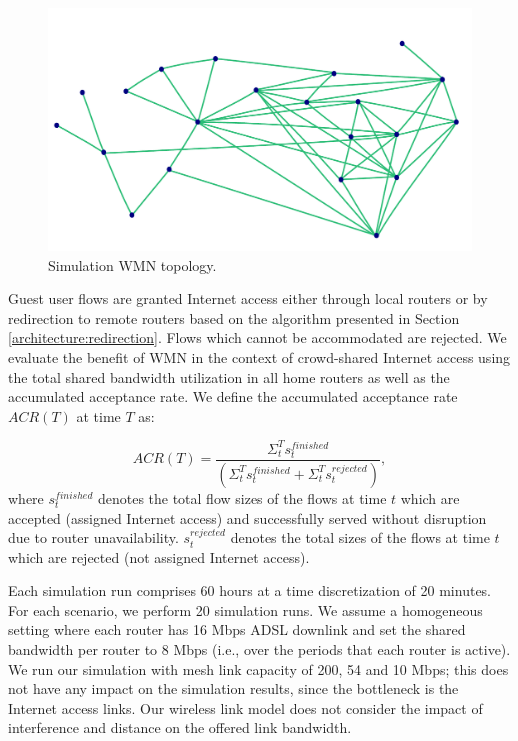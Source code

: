 \begin{figure}[t]
\begin{center}
\includegraphics[width=1\linewidth]{topology.pdf}
\caption{Simulation WMN topology.}
\label{fig:topology}
\end{center}
\end{figure}

Guest user flows are granted Internet access either through local routers or by redirection to remote routers based on the algorithm presented in Section \ref{architecture:redirection}. Flows which cannot be accommodated are rejected. We evaluate the benefit of WMN in the context of crowd-shared Internet access using the total shared bandwidth utilization in all home routers as well as the accumulated acceptance rate. We define the accumulated acceptance rate $ACR(T)$ at time $T$ as:

\begin{equation}\label{1}
ACR(T)= \frac{\Sigma^T_t s^{finished}_{t}}{(\Sigma^T_t s^{finished}_{t} + \Sigma^T_t s^{rejected}_{t})},
\end{equation}
%
where $s^{finished}_{t}$ denotes the total flow sizes of the flows at time $t$ which are accepted (assigned Internet access) and successfully served without disruption due to router unavailability. $s^{rejected}_{t}$ denotes the total sizes of the flows at time $t$ which are rejected (not assigned Internet access).

Each simulation run comprises 60 hours at a time discretization of 20 minutes. For each scenario, we perform 20 simulation runs. We assume a homogeneous setting where each router has 16 Mbps ADSL downlink and set the shared bandwidth per router to 8 Mbps (i.e., over the periods that each router is active). We run our simulation with mesh link capacity of 200, 54 and 10 Mbps; this does not have any impact on the simulation results, since the bottleneck is the Internet access links. Our wireless link model does not consider the impact of interference and distance on the offered link bandwidth.

